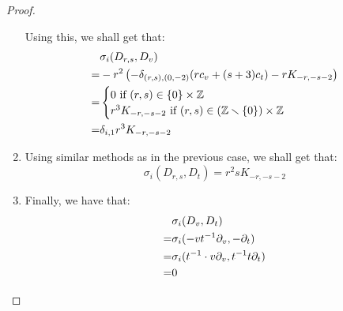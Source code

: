 \begin{proof}
\begin{enumerate}
                    Using this, we shall get that:
                        $$
                            \begin{aligned}
                                & \sigma_i(D_{r, s}, D_v)
                                \\
                                = & -r^2 \left( -\delta_{(r, s), (0, -2)} ( r c_v + (s + 3) c_t ) - r K_{-r, -s - 2} \right)
                                \\
                                = &
                                \begin{cases}
                                    \text{$0$ if $(r, s) \in \{0\} \x \Z$}
                                    \\
                                    \text{$r^3 K_{-r, -s - 2}$ if $(r, s) \in (\Z \setminus \{0\}) \x \Z$}
                                \end{cases}
                                \\
                                = & \delta_{i, 1} r^3 K_{-r, -s - 2}
                            \end{aligned}
                        $$
                    \item Using similar methods as in the previous case, we shall get that:
                        $$\sigma_i(D_{r, s}, D_t) = r^2s K_{-r, -s - 2}$$
                    \item Finally, we have that:
                        $$
                            \begin{aligned}
                                & \sigma_i(D_v, D_t)
                                \\
                                = & \sigma_i(-v t^{-1} \partial_v, -\partial_t)
                                \\
                                = & \sigma_i(t^{-1} \cdot v \partial_v, t^{-1} t \partial_t)
                                \\
                                = & 0
                            \end{aligned}
                        $$
                \end{enumerate}
            \end{proof}

